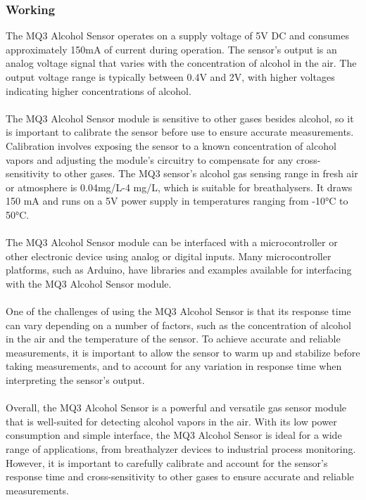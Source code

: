 \documentclass[12pt]{article}
\begin{document}
\subsubsection{Working}
The MQ3 Alcohol Sensor operates on a supply voltage of 5V DC and consumes approximately 150mA of current during operation. The sensor's output is an analog voltage signal that varies with the concentration of alcohol in the air. The output voltage range is typically between 0.4V and 2V, with higher voltages indicating higher concentrations of alcohol.
\\
\\
The MQ3 Alcohol Sensor module is sensitive to other gases besides alcohol, so it is important to calibrate the sensor before use to ensure accurate measurements. Calibration involves exposing the sensor to a known concentration of alcohol vapors and adjusting the module's circuitry to compensate for any cross-sensitivity to other gases. The MQ3 sensor's alcohol gas sensing range in fresh air or atmosphere is 0.04mg/L-4 mg/L, which is suitable for breathalysers. It draws 150 mA and runs on a 5V power supply in temperatures ranging from -10°C to 50°C.
\\
\\
The MQ3 Alcohol Sensor module can be interfaced with a microcontroller or other electronic device using analog or digital inputs. Many microcontroller platforms, such as Arduino, have libraries and examples available for interfacing with the MQ3 Alcohol Sensor module.
\\
\\
One of the challenges of using the MQ3 Alcohol Sensor is that its response time can vary depending on a number of factors, such as the concentration of alcohol in the air and the temperature of the sensor. To achieve accurate and reliable measurements, it is important to allow the sensor to warm up and stabilize before taking measurements, and to account for any variation in response time when interpreting the sensor's output.
\\
\\
Overall, the MQ3 Alcohol Sensor is a powerful and versatile gas sensor module that is well-suited for detecting alcohol vapors in the air. With its low power consumption and simple interface, the MQ3 Alcohol Sensor is ideal for a wide range of applications, from breathalyzer devices to industrial process monitoring. However, it is important to carefully calibrate and account for the sensor's response time and cross-sensitivity to other gases to ensure accurate and reliable measurements.
\\
\\
\end{document}
